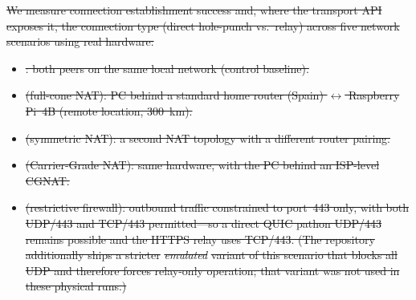 \documentclass[a4paper,fleqn]{cas-dc}
\providecommand{\DIFdel}[1]{{\protect\color{red}\sout{#1}}}                      %
\providecommand{\DIFdelbegin}{} %
\begin{document}
\DIFdelbegin \DIFdel{We measure connection establishment success and, where the transport API exposes it, the connection type (direct hole-punch vs.~relay) across five network scenarios using real hardware:
}%

\begin{itemize}%
\item%
\DIFdel{: both peers on the same local network (control baseline).
    }%
\item%
\DIFdel{(full-cone NAT): PC behind a standard home router (Spain) $\leftrightarrow$ Raspberry Pi~4B (remote location, 300~km).
    }%
\item%
\DIFdel{(symmetric NAT): a second NAT topology with a different router pairing.
    }%
\item%
\DIFdel{(Carrier-Grade NAT): same hardware, with the PC behind an ISP-level CGNAT.
    }%
\item%
\DIFdel{(restrictive firewall): outbound traffic constrained to port~443 only, with both UDP/443 and TCP/443 permitted---so a direct QUIC pathon UDP/443 remains possible and the HTTPS relay uses TCP/443. (The repository additionally ships a stricter }\emph{\DIFdel{emulated}} %
\DIFdel{variant of this scenario that blocks all UDP and therefore forces relay-only operation; that variant was not used in these physical runs.)
}
\end{itemize}%
\end{document}
